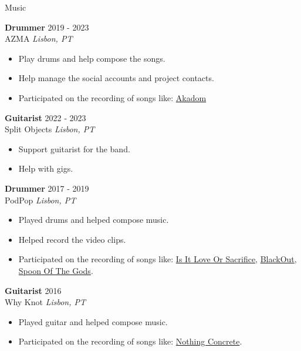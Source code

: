 \documentclass{resume} %
\begin{document}
\begin{rSection}{Music}

  \textbf{Drummer} \hfill 2019 - 2023 \\
  AZMA \hfill \textit{Lisbon, PT}
  \begin{itemize}
    \itemsep -3pt {} 
  \item Play drums and help compose the songs.
  \item Help manage the social accounts and project contacts.
  \item Participated on the recording of songs like: \href{https://www.youtube.com/watch?v=5XqsTF8x76Y}{Akadom}
  \end{itemize}

  \textbf{Guitarist} \hfill 2022 ‑ 2023 \\
  Split Objects \hfill \textit{Lisbon, PT}
  \begin{itemize}
    \itemsep -3pt {} 
  \item Support guitarist for the band.
  \item Help with gigs.
  \end{itemize}

  \textbf{Drummer} \hfill 2017 ‑ 2019 \\
  PodPop \hfill \textit{Lisbon, PT}
  \begin{itemize}
    \itemsep -3pt {} 
  \item Played drums and helped compose music.
  \item Helped record the video clips.
  \item Participated on the recording of songs like: \href{https://www.youtube.com/watch?v=9566jWHH9QU}{Is It Love Or Sacrifice},
    \href{https://www.youtube.com/watch?v=P65iTaV80Ps}{BlackOut},
    \href{https://www.youtube.com/watch?v=w3lSOWdkliA}{Spoon Of The Gods}.
  \end{itemize}

  \textbf{Guitarist} \hfill 2016 \\
  Why Knot \hfill \textit{Lisbon, PT}
  \begin{itemize}
    \itemsep -3pt {} 
  \item Played guitar and helped compose music.
  \item Participated on the recording of songs like: \href{https://www.youtube.com/watch?v=YBZZrDuIRKo}{Nothing Concrete}.
  \end{itemize}  
\end{rSection} 
\end{document}
